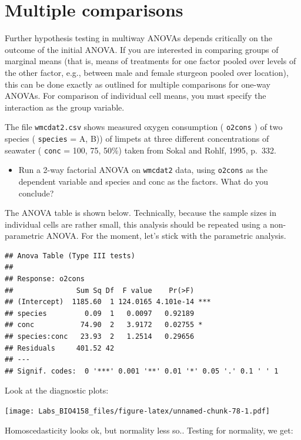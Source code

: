 \documentclass[
  12pt,
]{book}
\providecommand{\tightlist}{%
  \setlength{\itemsep}{0pt}\setlength{\parskip}{0pt}}
\begin{document}
\hypertarget{multiple-comparisons}{%
\section{Multiple comparisons}\label{multiple-comparisons}}

Further hypothesis testing in multiway ANOVAs depends critically on the outcome of the initial ANOVA. If you are interested in comparing groups of marginal means (that is, means of treatments for one factor pooled over levels of the other factor, e.g., between male and female sturgeon pooled over location), this can be done exactly as outlined for multiple comparisons for one-way ANOVAs. For comparison of individual cell means, you must specify the interaction as the group variable.

The file \texttt{wmcdat2.csv} shows measured oxygen consumption ( \texttt{o2cons} ) of two species ( \texttt{species} = A, B)) of limpets at three different concentrations of seawater ( \texttt{conc} = 100, 75, 50\%) taken from Sokal and Rohlf, 1995, p.~332.

\begin{itemize}
\tightlist
\item
  Run a 2-way factorial ANOVA on \texttt{wmcdat2} data, using \texttt{o2cons} as the dependent variable and species and conc as the factors. What do you conclude?
\end{itemize}

The ANOVA table is shown below. Technically, because the sample sizes in individual cells are rather small, this analysis should be repeated using a non-parametric ANOVA. For the moment, let's stick with the parametric analysis.

\begin{verbatim}
## Anova Table (Type III tests)
## 
## Response: o2cons
##               Sum Sq Df  F value    Pr(>F)    
## (Intercept)  1185.60  1 124.0165 4.101e-14 ***
## species         0.09  1   0.0097   0.92189    
## conc           74.90  2   3.9172   0.02755 *  
## species:conc   23.93  2   1.2514   0.29656    
## Residuals     401.52 42                       
## ---
## Signif. codes:  0 '***' 0.001 '**' 0.01 '*' 0.05 '.' 0.1 ' ' 1
\end{verbatim}

Look at the diagnostic plots:

\texttt{[image: Labs\_BIO4158\_files/figure-latex/unnamed-chunk-78-1.pdf]}

Homoscedasticity looks ok, but normality less so.. Testing for
normality, we get:
\end{document}
